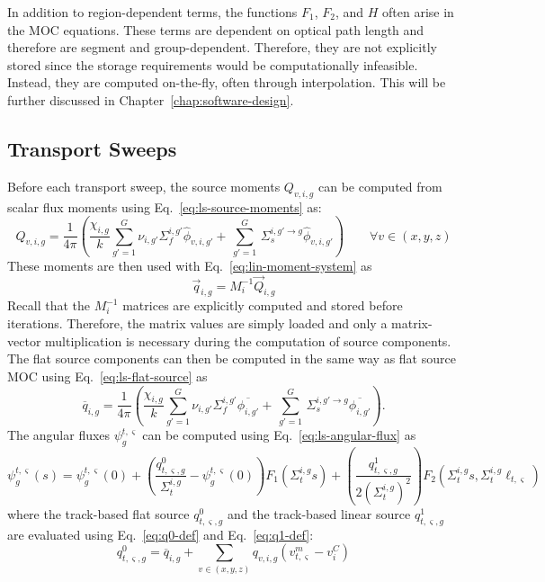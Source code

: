 In addition to region-dependent terms, the functions $F_1$, $F_2$, and $H$ often arise in the \ac{MOC} equations. These terms are dependent on optical path length and therefore are segment and group-dependent. Therefore, they are not explicitly stored since the storage requirements would be computationally infeasible. Instead, they are computed on-the-fly, often through interpolation. This will be further discussed in Chapter~\ref{chap:software-design}.

\subsection{Transport Sweeps}

Before each transport sweep, the source moments $Q_{v,i,g}$ can be computed from scalar flux moments using Eq.~\ref{eq:ls-source-moments} as:
\begin{equation*}
Q_{v,i,g} = \frac{1}{4 \pi} \left( \frac{\chi_{i,g}}{k} \sum_{g'=1}^{G} \nu_{i,g'} \Sigma_f^{i,g'} \hat{\phi}_{v,i,g'} + \, \sum_{g'=1}^G \,  \Sigma_{s}^{i,g' \rightarrow g} \hat{\phi}_{v,i,g'} \right) \qquad \forall v \in (x,y,z)
\end{equation*}
These moments are then used with Eq.~\ref{eq:lin-moment-system} as
\begin{equation*}
\vec{q}_{i,g} = M_i^{-1} \vec{Q}_{i,g}
\end{equation*}
Recall that the $M_i^{-1}$ matrices are explicitly computed and stored before iterations. Therefore, the matrix values are simply loaded and only a matrix-vector multiplication is necessary during the computation of source components. The flat source components can then be computed in the same way as flat source \ac{MOC} using Eq.~\ref{eq:ls-flat-source} as
\begin{equation*}
\overline{q}_{i,g} = \frac{1}{4 \pi} \left( \frac{\chi_{i,g}}{k} \sum_{g'=1}^{G} \nu_{i,g'} \Sigma_f^{i,g'} \overline{\phi_{i,g'}} + \, \sum_{g'=1}^G \,  \Sigma_{s}^{i,g' \rightarrow g} \overline{\phi_{i,g'}} \right).
\end{equation*}
The angular fluxes $\psi_g^{t,\varsigma}$ can be computed using Eq.~\ref{eq:ls-angular-flux} as
\begin{equation*}
	\psi_g^{t,\varsigma}(s) = \psi_g^{t,\varsigma}(0) + \left( \frac{q^0_{t,\varsigma,g}}{\Sigma_{t}^{i,g}} - \psi_g^{t,\varsigma}(0) \right) F_1\left(\Sigma_{t}^{i,g} s \right) + \left(\frac{q^1_{t,\varsigma,g}}{2\left(\Sigma_{t}^{i,g}\right)^2}\right) F_2\left(\Sigma_{t}^{i,g} s, \Sigma_{t}^{i,g} \ell_{t,\varsigma} \right)
\end{equation*}
where the track-based flat source $q^0_{t,\varsigma,g}$ and the track-based linear source $q^1_{t,\varsigma,g}$ are evaluated using Eq.~\ref{eq:q0-def} and Eq.~\ref{eq:q1-def}:
\begin{equation}
	\nonumber
	q^0_{t,\varsigma,g} = \overline{q}_{i,g} + \sum_{v \in (x,y,z)} q_{v,i,g} \left( v^m_{t,\varsigma} - v^C_i \right)
\end{equation}

